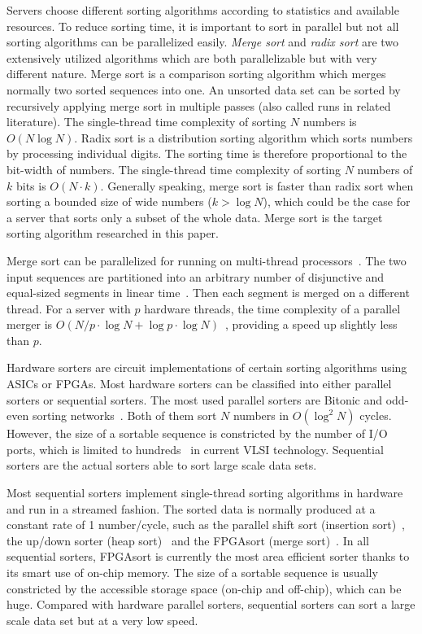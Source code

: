 \documentclass[10pt, conference]{IEEEtran}
\begin{document}
Servers choose different sorting algorithms according to statistics and available resources.
To reduce sorting time, it is important to sort in parallel but not all sorting algorithms can be parallelized easily.
\emph{Merge sort} and \emph{radix sort} are two extensively utilized algorithms which are both parallelizable but with very different nature.
Merge sort is a comparison sorting algorithm which merges normally two sorted sequences into one.
An unsorted data set can be sorted by recursively applying merge sort in multiple passes (also called runs in related literature).
The single-thread time complexity of sorting $N$ numbers is $O(N \log N)$.
Radix sort is a distribution sorting algorithm which sorts numbers by processing individual digits.
The sorting time is therefore proportional to the bit-width of numbers.
The single-thread time complexity of sorting $N$ numbers of $k$ bits is $O(N \cdot k)$.
Generally speaking, merge sort is faster than radix sort when sorting a bounded size of wide numbers ($k > \log N$),
which could be the case for a server that sorts only a subset of the whole data.
Merge sort is the target sorting algorithm researched in this paper.


Merge sort can be parallelized for running on multi-thread processors~\cite{Satish2009, Odeh2012}.
The two input sequences are partitioned into an arbitrary number of disjunctive and equal-sized segments in linear time~\cite{Odeh2012}.
Then each segment is merged on a different thread.
For a server with $p$ hardware threads, the time complexity of a parallel merger is $O(N/p \cdot \log N + \log p \cdot \log N)$~\cite{Odeh2012},
providing a speed up slightly less than $p$.


Hardware sorters are circuit implementations of certain sorting algorithms using ASICs or FPGAs.
Most hardware sorters can be classified into either parallel sorters or sequential sorters.
The most used parallel sorters are Bitonic and odd-even sorting networks~\cite{Batcher1968}.
Both of them sort $N$ numbers in $O(\log^2N)$ cycles.
However, the size of a sortable sequence is constricted by the number of I/O ports,
which is limited to hundreds~\cite{Farmahini-Farahani2013} in current VLSI technology.
Sequential sorters are the actual sorters able to sort large scale data sets.


Most sequential sorters implement single-thread sorting algorithms in hardware and run in a streamed fashion.
The sorted data is normally produced at a constant rate of 1 number/cycle,
such as the parallel shift sort (insertion sort)~\cite{Arisland1984}, the up/down sorter (heap sort)~\cite{Moore1995} and the FPGAsort (merge sort)~\cite{Koch2011}.
In all sequential sorters, FPGAsort is currently the most area efficient sorter thanks to its smart use of on-chip memory.
The size of a sortable sequence is usually constricted by the accessible storage space (on-chip and off-chip), which can be huge.
Compared with hardware parallel sorters, sequential sorters can sort a large scale data set but at a very low speed.
\end{document}
